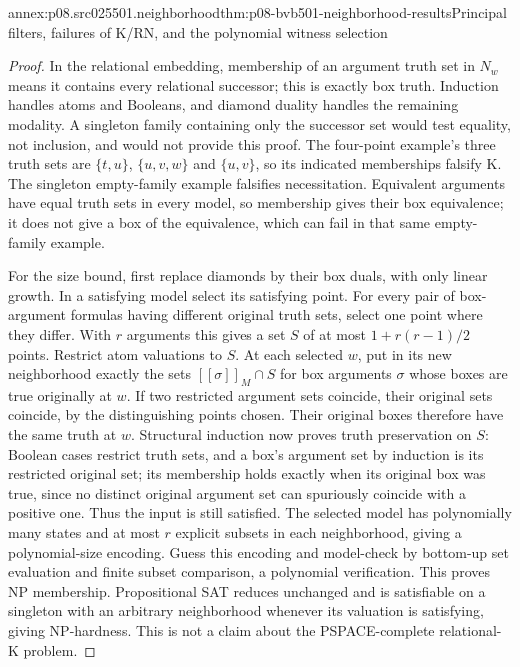 \begin{annexitem}{annex:p08.src025501.neighborhood}{thm:p08-bvb501-neighborhood-results}{Principal filters, failures of K/RN, and the polynomial witness selection}
\begin{proof}
In the relational embedding, membership of an argument truth set in
\(N_w\) means it contains every relational successor; this is
exactly box truth. Induction handles atoms and Booleans, and diamond
duality handles the remaining modality. A singleton family containing
only the successor set would test equality, not inclusion, and would
not provide this proof. The four-point example's three truth sets
are \(\{t,u\}\), \(\{u,v,w\}\) and \(\{u,v\}\),
so its indicated memberships falsify K. The singleton empty-family
example falsifies necessitation. Equivalent arguments have equal
truth sets in every model, so membership gives their box equivalence;
it does not give a box of the equivalence, which can fail in that
same empty-family example.

For the size bound, first replace diamonds by their box duals, with
only linear growth. In a satisfying model select its satisfying point.
For every pair of box-argument formulas having different original
truth sets, select one point where they differ. With \(r\)
arguments this gives a set \(S\) of at most
\(1+r(r-1)/2\) points. Restrict atom valuations to \(S\).
At each selected \(w\), put in its new neighborhood exactly the
sets \([\![\sigma]\!]_M\cap S\) for box arguments
\(\sigma\) whose boxes are true originally at \(w\).
If two restricted argument sets coincide, their original sets coincide,
by the distinguishing points chosen. Their original boxes therefore
have the same truth at \(w\). Structural induction now proves
truth preservation on \(S\): Boolean cases restrict truth sets,
and a box's argument set by induction is its restricted original set;
its membership holds exactly when its original box was true, since
no distinct original argument set can spuriously coincide with a
positive one. Thus the input is still satisfied.
The selected model has polynomially many states and at most \(r\)
explicit subsets in each neighborhood, giving a polynomial-size encoding.
Guess this encoding and model-check by bottom-up set evaluation and
finite subset comparison, a polynomial verification. This proves NP
membership. Propositional SAT reduces unchanged and is satisfiable
on a singleton with an arbitrary neighborhood whenever its valuation
is satisfying, giving NP-hardness. This is not a claim about the
PSPACE-complete relational-K problem.
\end{proof}
\end{annexitem}

